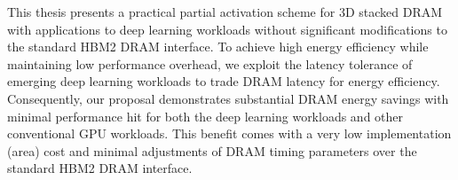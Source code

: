 This thesis presents a practical partial activation scheme for 3D stacked DRAM with applications to deep learning workloads without significant modifications to the standard HBM2 DRAM interface. To achieve high energy efficiency while maintaining low performance overhead, we exploit the latency tolerance of emerging deep learning workloads to trade DRAM latency for energy efficiency. Consequently, our proposal demonstrates substantial DRAM energy savings with minimal performance hit for both the deep learning workloads and other conventional GPU workloads. This benefit comes with a very low implementation (area) cost and minimal adjustments of DRAM timing parameters over the standard HBM2 DRAM interface.
